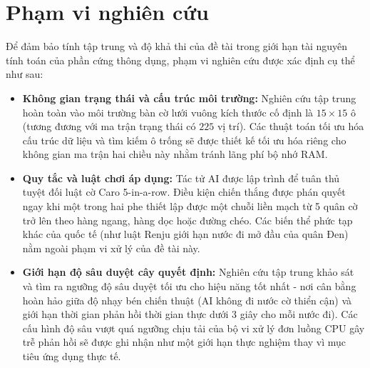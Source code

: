 \section{Phạm vi nghiên cứu}

Để đảm bảo tính tập trung và độ khả thi của đề tài trong giới hạn tài nguyên tính toán của phần cứng thông dụng, phạm vi nghiên cứu được xác định cụ thể như sau:

\begin{itemize}
	\item \textbf{Không gian trạng thái và cấu trúc môi trường:} Nghiên cứu tập trung hoàn toàn vào môi trường bàn cờ lưới vuông kích thước cố định là $15 \times 15$ ô (tương đương với ma trận trạng thái có $225$ vị trí). Các thuật toán tối ưu hóa cấu trúc dữ liệu và tìm kiếm ô trống sẽ được thiết kế tối ưu hóa riêng cho không gian ma trận hai chiều này nhằm tránh lãng phí bộ nhớ RAM.
	
	\item \textbf{Quy tắc và luật chơi áp dụng:} Tác tử AI được lập trình để tuân thủ tuyệt đối luật cờ Caro 5-in-a-row. Điều kiện chiến thắng được phán quyết ngay khi một trong hai phe thiết lập được một chuỗi liền mạch từ 5 quân cờ trở lên theo hàng ngang, hàng dọc hoặc đường chéo. Các biến thể phức tạp khác của quốc tế (như luật Renju giới hạn nước đi mở đầu của quân Đen) nằm ngoài phạm vi xử lý của đề tài này.
	
	\item \textbf{Giới hạn độ sâu duyệt cây quyết định:} Nghiên cứu tập trung khảo sát và tìm ra ngưỡng độ sâu duyệt tối ưu cho hiệu năng tốt nhất - nơi cân bằng hoàn hảo giữa độ nhạy bén chiến thuật (AI không đi nước cờ thiển cận) và giới hạn thời gian phản hồi thời gian thực dưới 3 giây cho mỗi nước đi). Các cấu hình độ sâu vượt quá ngưỡng chịu tải của bộ vi xử lý đơn luồng CPU gây trễ phản hồi sẽ được ghi nhận như một giới hạn thực nghiệm thay vì mục tiêu ứng dụng thực tế.
\end{itemize}